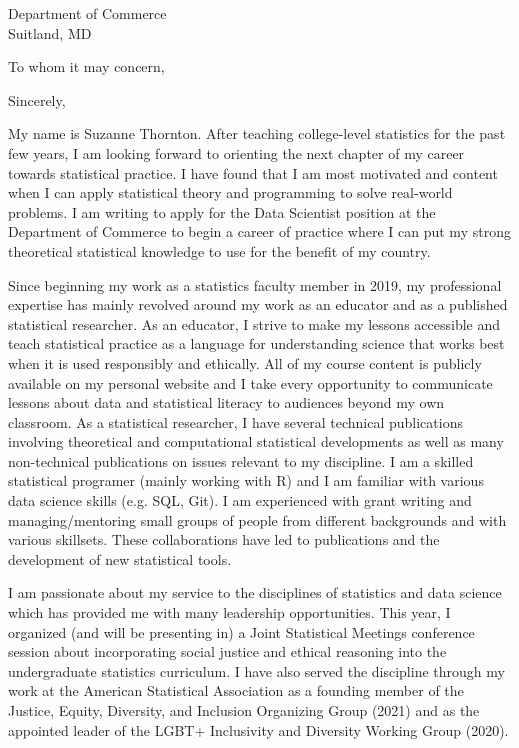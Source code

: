 \documentclass[11pt,a4paper,sans]{moderncv}
\begin{document}
	
	{Department of Commerce\\ 
	Suitland, MD}
	\date{\today }
	\opening{To whom it may concern,}
	\closing{Sincerely,}
	\makelettertitle
	
	
	
	
	
	My name is Suzanne Thornton. After teaching college-level statistics for the past few years, I am looking forward to orienting the next chapter of my career towards statistical practice. I have found that I am most motivated and content when I can apply statistical theory and programming to solve real-world problems. I am writing to apply for the Data Scientist position at the Department of Commerce to begin a career of practice where I can put my strong theoretical statistical knowledge to use for the benefit of my country.\\ \vspace{.5cm}

Since beginning my work as a statistics faculty member in 2019, my professional expertise has mainly revolved around my work as an educator and as a published statistical researcher. As an educator, I strive to make my lessons accessible and teach statistical practice as a language for understanding science that works best when it is used responsibly and ethically. All of my course content is publicly available on my personal website and I take every opportunity to communicate lessons about data and statistical literacy to audiences beyond my own classroom. As a statistical researcher, I have several technical publications involving theoretical and computational statistical developments as well as many non-technical publications on issues relevant to my discipline. I am a skilled statistical programer (mainly working with R) and I am familiar with various data science skills (e.g. SQL, Git). I am experienced with grant writing and managing/mentoring small groups of people from different backgrounds and with various skillsets. These collaborations have led to publications and the development of new statistical tools. 

I am passionate about my service to the disciplines of statistics and data science which has provided me with many leadership opportunities. This year, I organized (and will be presenting in) a Joint Statistical Meetings conference session about incorporating social justice and ethical reasoning into the undergraduate statistics curriculum. I have also served the discipline through my work at the American Statistical Association as a founding member of the Justice, Equity, Diversity, and Inclusion Organizing Group (2021) and as the appointed leader of the LGBT+ Inclusivity and Diversity Working Group (2020). 
\end{document}
